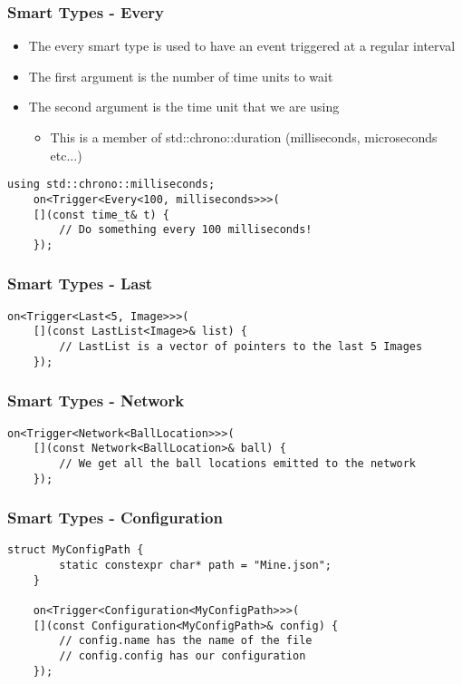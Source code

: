 \documentclass{beamer}
\begin{document}
\begin{frame}[fragile]
	\frametitle{Smart Types - Every}
	\begin{itemize}
		\item The every smart type is used to have an event triggered at a regular interval
		\item The first argument is the number of time units to wait
		\item The second argument is the time unit that we are using
		\begin{itemize}
			\item This is a member of std::chrono::duration (milliseconds, microseconds etc...)
		\end{itemize}
	\end{itemize}

	\begin{lstlisting}[language=nuclear]
	using std::chrono::milliseconds;
	on<Trigger<Every<100, milliseconds>>>(
	[](const time_t& t) {
		// Do something every 100 milliseconds!
	});
	\end{lstlisting}
\end{frame}

\begin{frame}[fragile]
	\frametitle{Smart Types - Last}
	\begin{lstlisting}[language=nuclear]
	on<Trigger<Last<5, Image>>>(
	[](const LastList<Image>& list) {
		// LastList is a vector of pointers to the last 5 Images
	});
	\end{lstlisting}
\end{frame}

\begin{frame}[fragile]
	\frametitle{Smart Types - Network}
	\begin{lstlisting}[language=nuclear]
	on<Trigger<Network<BallLocation>>>(
	[](const Network<BallLocation>& ball) {
		// We get all the ball locations emitted to the network
	});
	\end{lstlisting}
\end{frame}

\begin{frame}[fragile]
	\frametitle{Smart Types - Configuration}
	\begin{lstlisting}[language=nuclear]
	struct MyConfigPath {
		static constexpr char* path = "Mine.json";
	}
	
	on<Trigger<Configuration<MyConfigPath>>>(
	[](const Configuration<MyConfigPath>& config) {
		// config.name has the name of the file
		// config.config has our configuration
	});
	\end{lstlisting}
\end{frame}
\end{document}
